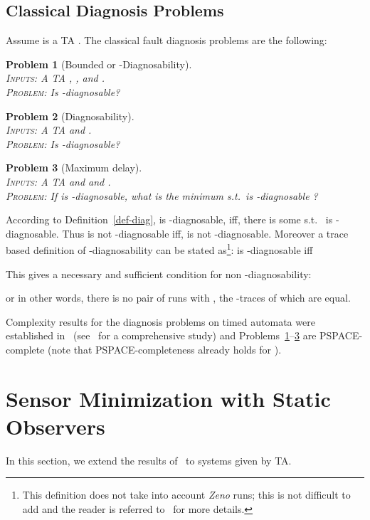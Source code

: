 \documentclass[letterpaper,10pt,conference]{ieeeconf}  \IEEEoverridecommandlockouts                              \overrideIEEEmargins
\def\st{{s.t.}~}
\newtheorem{prob}{Problem}  \newtheorem{definition}{Definition}
\def\ssi{iff\xspace}
\begin{document}
\subsection{Classical Diagnosis Problems}
\noindent
Assume  is a TA
.  The
classical fault diagnosis problems are the following: \begin{prob}[Bounded or -Diagnosability] \label{prob-delta-diag} \mbox{} \\
  \textsc{Inputs:} A  TA , , and . \\
  \textsc{Problem:} Is  -diagnosable?
\end{prob}
\begin{prob}[Diagnosability] \label{prob-diag} \mbox{} \\
  \textsc{Inputs:} A TA  and . \\
  \textsc{Problem:} Is  -diagnosable?
\end{prob}
\begin{prob}[Maximum delay] \label{prob-delay} \mbox{} \\
  \textsc{Inputs:} A TA  and and . \\
  \textsc{Problem:} If  is -diagnosable, what is the
  minimum  \st  is -diagnosable ?
\end{prob}
\smallskip



According to Definition~\ref{def-diag}, 
is -diagnosable, \ssi, there is some  \st
 is -diagnosable. Thus  is not -diagnosable
\ssi ,  is not  -diagnosable.
Moreover a trace based definition of
-diagnosability can be stated as\footnote{This
  definition does not take into account \emph{Zeno} runs; this is not
  difficult to add and the reader is referred to~\cite{cassez-cdc-09}
  for more details.}:  is -diagnosable \ssi

This gives a necessary and sufficient condition for non
-diagnosability:

or in other words, there is no pair of runs  with
,  the
-traces of which are equal.


Complexity results for the diagnosis problems on timed automata were
established in~\cite{tripakis-02} (see~\cite{cassez-cdc-09} for a
comprehensive study) and
Problems~\ref{prob-delta-diag}--\ref{prob-delay} are PSPACE-complete
(note that PSPACE-completeness already holds for ).


\section{Sensor Minimization with Static Observers}
\label{sec-static}
In this section, we extend the results of~\cite{cassez-acsd-07} to
systems given by TA.
\end{document}

